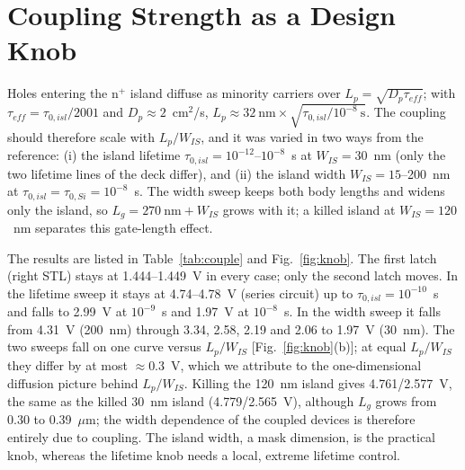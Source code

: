 \documentclass[journal]{IEEEtran}
\begin{document}
\section{Coupling Strength as a Design Knob}
Holes entering the n$^+$ island diffuse as minority carriers over $L_p=\sqrt{D_p\tau_{eff}}$; with $\tau_{eff}=\tau_{0,isl}/2001$ and $D_p\approx2$~cm$^2$/s, $L_p\approx32~\mathrm{nm}\times\sqrt{\tau_{0,isl}/10^{-8}~\mathrm{s}}$. The coupling should therefore scale with $L_p/W_{IS}$, and it was varied in two ways from the reference: (i) the island lifetime $\tau_{0,isl}=10^{-12}$--$10^{-8}$~s at $W_{IS}=30$~nm (only the two lifetime lines of the deck differ), and (ii) the island width $W_{IS}=15$--200~nm at $\tau_{0,isl}=\tau_{0,Si}=10^{-8}$~s. The width sweep keeps both body lengths and widens only the island, so $L_g=270~\mathrm{nm}+W_{IS}$ grows with it; a killed island at $W_{IS}=120$~nm separates this gate-length effect.

The results are listed in Table~\ref{tab:couple} and Fig.~\ref{fig:knob}. The first latch (right STL) stays at 1.444--1.449~V in every case; only the second latch moves. In the lifetime sweep it stays at 4.74--4.78~V (series circuit) up to $\tau_{0,isl}=10^{-10}$~s and falls to 2.99~V at $10^{-9}$~s and 1.97~V at $10^{-8}$~s. In the width sweep it falls from 4.31~V (200~nm) through 3.34, 2.58, 2.19 and 2.06 to 1.97~V (30~nm). The two sweeps fall on one curve versus $L_p/W_{IS}$ [Fig.~\ref{fig:knob}(b)]; at equal $L_p/W_{IS}$ they differ by at most $\approx0.3$~V, which we attribute to the one-dimensional diffusion picture behind $L_p/W_{IS}$. Killing the 120~nm island gives 4.761/2.577~V, the same as the killed 30~nm island (4.779/2.565~V), although $L_g$ grows from 0.30 to 0.39~$\mu$m; the width dependence of the coupled devices is therefore entirely due to coupling. The island width, a mask dimension, is the practical knob, whereas the lifetime knob needs a local, extreme lifetime control.
\end{document}
